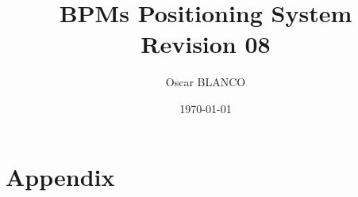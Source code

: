 \documentclass[a4paper,11pt]{book}
\title{BPMs Positioning System\\{\small Revision 08}}
\author{Oscar BLANCO}
\date{\today}
\begin{document}
\maketitle
\tableofcontents
\listoffigures
\listoftables
\frontmatter

\mainmatter




\appendix
\chapter{Appendix}



\backmatter

\end{document}
